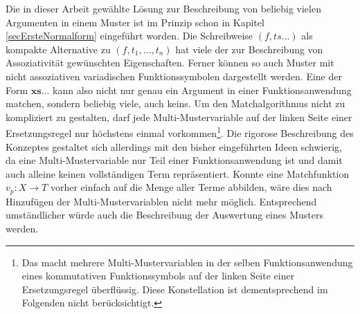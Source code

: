 Die in dieser Arbeit gewählte Lösung zur Beschreibung von beliebig vielen Argumenten in einem Muster ist im Prinzip schon in Kapitel \ref{secErsteNormalform} eingeführt worden. Die Schreibweise $(f, ts...)$ als kompakte Alternative zu $(f, t_1, \dots, t_n)$ hat viele der zur Beschreibung von Assoziativität gewünschten Eigenschaften. Ferner können so auch Muster mit nicht assoziativen variadischen Funktionssymbolen dargestellt werden. Eine  der Form $\mathbf{xs...}$ kann also nicht nur genau ein Argument in einer Funktionsanwendung matchen, sondern beliebig viele, auch keins. Um den Matchalgorithmus nicht zu kompliziert zu gestalten, darf jede Multi-Mustervariable auf der linken Seite einer Ersetzungsregel nur höchstens einmal vorkommen\footnote{Das macht mehrere Multi-Mustervariablen in der selben Funktionsanwendung eines kommutativen Funktionssymbols auf der linken Seite einer Ersetzungsregel überflüssig. Diese Konstellation ist dementsprechend im Folgenden nicht berücksichtigt.}. Die rigorose Beschreibung des Konzeptes gestaltet sich allerdings mit den bisher eingeführten Ideen schwierig, da eine Multi-Mustervariable nur Teil einer Funktionsanwendung ist und damit auch alleine keinen vollständigen Term repräsentiert. Konnte eine Matchfunktion $v_p \colon X \rightarrow T$ vorher einfach auf die Menge aller Terme abbilden, wäre dies nach Hinzufügen der Multi-Mustervariablen nicht mehr möglich. Entsprechend umständlicher würde auch die Beschreibung der Auswertung eines Musters werden. \\

